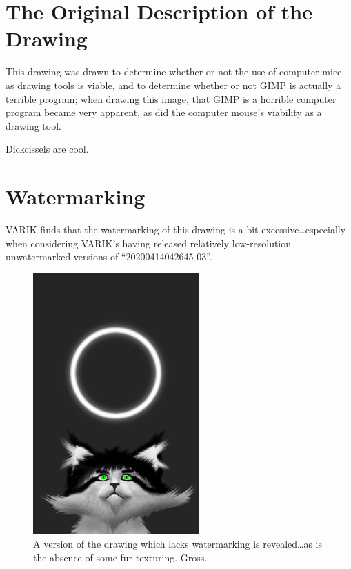 \documentclass{report}
\begin{document}
\section{The Original Description of the Drawing}
This drawing was drawn to determine whether or not the use of computer mice as drawing tools is viable, and to determine whether or not GIMP is actually a terrible program; when drawing this image, that GIMP is a horrible computer program became very apparent, as did the computer mouse's viability as a drawing tool.

Dickcissels are cool.
\section{Watermarking}
VARIK finds that the watermarking of this drawing is a bit excessive\ldots especially when considering VARIK's having released relatively low-resolution unwatermarked versions of ``20200414042645-03''.
\begin{figure}[ht]
	\centering
	\includegraphics[height=10cm]{20200414042645-03/20200414042645-03-uw.png}
	\caption[center]{A version of the drawing which lacks watermarking is revealed\ldots as is the absence of some fur texturing.  Gross.}
\end{figure}
\end{document}
